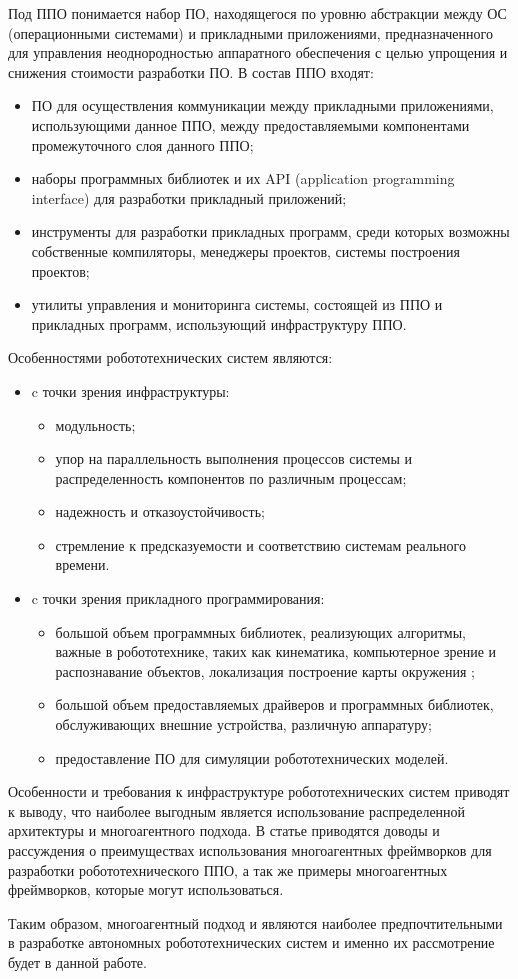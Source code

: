 Под ППО понимается набор ПО, находящегося по уровню абстракции между ОС (операционными системами) и прикладными приложениями, предназначенного для управления неоднородностью аппаратного обеспечения с целью упрощения и снижения стоимости разработки ПО. В состав ППО входят:
\begin{itemize}
	\item ПО для осуществления коммуникации между прикладными приложениями, использующими данное ППО, между предоставляемыми компонентами промежуточного слоя данного ППО;
	\item наборы программных библиотек и их API (application programming interface) для разработки прикладный приложений;
	\item инструменты для разработки прикладных программ, среди которых возможны собственные компиляторы, менеджеры проектов, системы построения проектов;
	\item утилиты управления и мониторинга системы, состоящей из ППО и прикладных программ, использующий инфраструктуру ППО.
\end{itemize}

Особенностями робототехнических систем являются:
\begin{itemize}[noitemsep]
	\item c точки зрения инфраструктуры:
	\begin{itemize}[noitemsep]
		\item модульность;
		\item упор на параллельность выполнения процессов системы и распределенность компонентов по различным процессам;
		\item надежность и отказоустойчивость;
		\item стремление к предсказуемости и соответствию системам реального времени.
	\end{itemize}
	\item c точки зрения прикладного программирования:
	\begin{itemize}[noitemsep]
		\item большой объем программных библиотек, реализующих алгоритмы, важные в робототехнике, таких как кинематика, компьютерное зрение и распознавание объектов, локализация построение карты окружения \etc;
		\item большой объем предоставляемых драйверов и программных библиотек, обслуживающих внешние устройства, различную аппаратуру;
		\item предоставление ПО для симуляции робототехнических моделей.
	\end{itemize}
\end{itemize}

Особенности и требования к инфраструктуре робототехнических систем приводят к выводу, что наиболее выгодным является использование распределенной архитектуры и многоагентного подхода. В статье \cite{blasco2012multiagent} приводятся доводы и рассуждения о преимуществах использования многоагентных фреймворков для разработки робототехнического ППО, а так же примеры многоагентных фреймворков, которые могут использоваться. 

Таким образом, многоагентный подход и \marm{}  являются наиболее предпочтительными в разработке автономных робототехнических систем и именно их рассмотрение будет в данной работе.